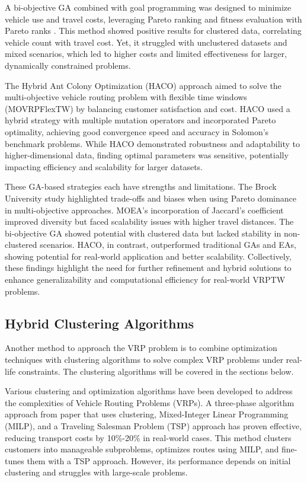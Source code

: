 A bi-objective GA combined with goal programming was designed to minimize vehicle use and travel costs, leveraging Pareto ranking and fitness evaluation with Pareto ranks \cite{Ghoseiri_Ghannadpour_2010}. This method showed positive results for clustered data, correlating vehicle count with travel cost. Yet, it struggled with unclustered datasets and mixed scenarios, which led to higher costs and limited effectiveness for larger, dynamically constrained problems.

The Hybrid Ant Colony Optimization (HACO) approach \cite{Zhang_Zhang_Ma_Zhang_Liu_2019} aimed to solve the multi-objective vehicle routing problem with flexible time windows (MOVRPFlexTW) by balancing customer satisfaction and cost. HACO used a hybrid strategy with multiple mutation operators and incorporated Pareto optimality, achieving good convergence speed and accuracy in Solomon’s benchmark problems. While HACO demonstrated robustness and adaptability to higher-dimensional data, finding optimal parameters was sensitive, potentially impacting efficiency and scalability for larger datasets.

These GA-based strategies each have strengths and limitations. The Brock University study highlighted trade-offs and biases when using Pareto dominance in multi-objective approaches. MOEA's incorporation of Jaccard’s coefficient improved diversity but faced scalability issues with higher travel distances. The bi-objective GA showed potential with clustered data but lacked stability in non-clustered scenarios. HACO, in contrast, outperformed traditional GAs and EAs, showing potential for real-world application and better scalability. Collectively, these findings highlight the need for further refinement and hybrid solutions to enhance generalizability and computational efficiency for real-world VRPTW problems.


\subsection{Hybrid Clustering Algorithms}

Another method to approach the VRP problem is to combine optimization techniques with clustering algorithms to solve complex VRP problems under real-life constraints. The clustering algorithms will be covered in the sections below.

Various clustering and optimization algorithms have been developed to address the complexities of Vehicle Routing Problems (VRPs). A three-phase algorithm approach from paper \cite{3_phase_cluster} that uses clustering, Mixed-Integer Linear Programming (MILP), and a Traveling Salesman Problem (TSP) approach has proven effective, reducing transport costs by 10\%-20\% in real-world cases. This method clusters customers into manageable subproblems, optimizes routes using MILP, and fine-tunes them with a TSP approach. However, its performance depends on initial clustering and struggles with large-scale problems.

